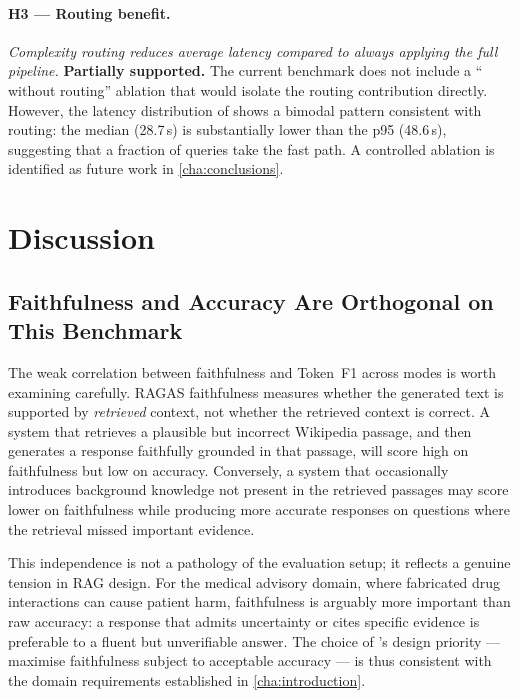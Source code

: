 \paragraph{H3 --- Routing benefit.}
\emph{Complexity routing reduces average latency compared to always applying the full
pipeline.}
\textbf{Partially supported.} The current benchmark does not include a ``\rarerag{}
without routing'' ablation that would isolate the routing contribution directly.
However, the latency distribution of \rarerag{} shows a bimodal pattern consistent
with routing: the median (28.7\,s) is substantially lower than the p95 (48.6\,s),
suggesting that a fraction of queries take the fast path. A controlled ablation is
identified as future work in \cref{cha:conclusions}.

\section{Discussion}
\label{sec:discussion}

\subsection{Faithfulness and Accuracy Are Orthogonal on This Benchmark}

The weak correlation between faithfulness and Token~F1 across modes is worth
examining carefully.
RAGAS faithfulness measures whether the generated text is supported by
\emph{retrieved} context, not whether the retrieved context is correct.
A system that retrieves a plausible but incorrect Wikipedia passage, and then
generates a response faithfully grounded in that passage, will score high on
faithfulness but low on accuracy.
Conversely, a system that occasionally introduces background knowledge not
present in the retrieved passages may score lower on faithfulness while
producing more accurate responses on questions where the retrieval missed
important evidence.

This independence is not a pathology of the evaluation setup; it reflects a
genuine tension in RAG design.
For the medical advisory domain, where fabricated drug interactions can cause
patient harm, faithfulness is arguably more important than raw accuracy: a
response that admits uncertainty or cites specific evidence is preferable to
a fluent but unverifiable answer.
The choice of \rarerag{}'s design priority --- maximise faithfulness subject to
acceptable accuracy --- is thus consistent with the domain requirements
established in \cref{cha:introduction}.

